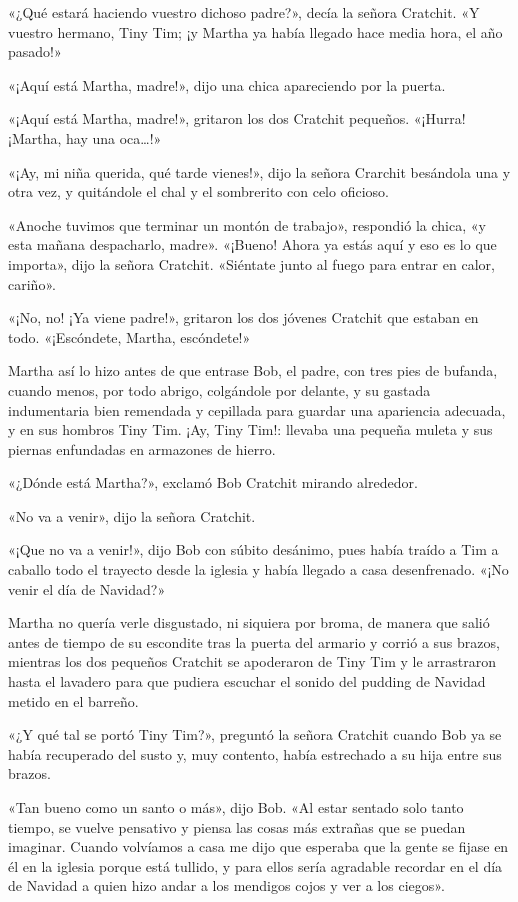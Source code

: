 \documentclass{novela}
\begin{document}
 «¿Qué estará haciendo vuestro dichoso padre?», decía la señora Cratchit. «Y vuestro hermano, Tiny Tim; ¡y Martha ya había llegado hace media hora, el año pasado!»

 «¡Aquí está Martha, madre!», dijo una chica apareciendo por la puerta.

 «¡Aquí está Martha, madre!», gritaron los dos Cratchit pequeños. «¡Hurra! ¡Martha, hay una oca{\ldots}!»

 «¡Ay, mi niña querida, qué tarde vienes!», dijo la señora Crarchit besándola una y otra vez, y quitándole el chal y el sombrerito con celo oficioso.

 «Anoche tuvimos que terminar un montón de trabajo», respondió la chica, «y esta mañana despacharlo, madre». «¡Bueno! Ahora ya estás aquí y eso es lo que importa», dijo la señora Cratchit. «Siéntate junto al fuego para entrar en calor, cariño».

 «¡No, no! ¡Ya viene padre!», gritaron los dos jóvenes Cratchit que estaban en todo. «¡Escóndete, Martha, escóndete!»

 Martha así lo hizo antes de que entrase Bob, el padre, con tres pies de bufanda, cuando menos, por todo abrigo, colgándole por delante, y su gastada indumentaria bien remendada y cepillada para guardar una apariencia adecuada, y en sus hombros Tiny Tim. ¡Ay, Tiny Tim!: llevaba una pequeña muleta y sus piernas enfundadas en armazones de hierro.

 «¿Dónde está Martha?», exclamó Bob Cratchit mirando alrededor.

 «No va a venir», dijo la señora Cratchit.

 «¡Que no va a venir!», dijo Bob con súbito desánimo, pues había traído a Tim a caballo todo el trayecto desde la iglesia y había llegado a casa desenfrenado. «¡No venir el día de Navidad?»

 Martha no quería verle disgustado, ni siquiera por broma, de manera que salió antes de tiempo de su escondite tras la puerta del armario y corrió a sus brazos, mientras los dos pequeños Cratchit se apoderaron de Tiny Tim y le arrastraron hasta el lavadero para que pudiera escuchar el sonido del pudding de Navidad metido en el barreño.

 «¿Y qué tal se portó Tiny Tim?», preguntó la señora Cratchit cuando Bob ya se había recuperado del susto y, muy contento, había estrechado a su hija entre sus brazos.

 «Tan bueno como un santo o más», dijo Bob. «Al estar sentado solo tanto tiempo, se vuelve pensativo y piensa las cosas más extrañas que se puedan imaginar. Cuando volvíamos a casa me dijo que esperaba que la gente se fijase en él en la iglesia porque está tullido, y para ellos sería agradable recordar en el día de Navidad a quien hizo andar a los mendigos cojos y ver a los ciegos».
\end{document}
